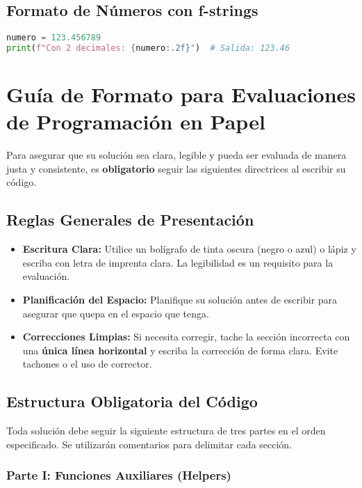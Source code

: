 \documentclass[11pt,a4paper]{article}
\begin{document}
\subsection{Formato de Números con f-strings}

\begin{lstlisting}[language=Python]
numero = 123.456789
print(f"Con 2 decimales: {numero:.2f}")  # Salida: 123.46
\end{lstlisting}

\newpage

\section{Guía de Formato para Evaluaciones de Programación en Papel}

Para asegurar que su solución sea clara, legible y pueda ser evaluada de manera justa y consistente, es \textbf{obligatorio} seguir las siguientes directrices al escribir su código.

\subsection{Reglas Generales de Presentación}

\begin{itemize}[leftmargin=*]
    \item \textbf{Escritura Clara:} Utilice un bolígrafo de tinta oscura (negro o azul) o lápiz y escriba con letra de imprenta clara. La legibilidad es un requisito para la evaluación.
    \item \textbf{Planificación del Espacio:} Planifique su solución antes de escribir para asegurar que quepa en el espacio que tenga.
    \item \textbf{Correcciones Limpias:} Si necesita corregir, tache la sección incorrecta con una \textbf{única línea horizontal} y escriba la corrección de forma clara. Evite tachones o el uso de corrector.
\end{itemize}

\subsection{Estructura Obligatoria del Código}

Toda solución debe seguir la siguiente estructura de tres partes en el orden especificado. Se utilizarán comentarios para delimitar cada sección.

\subsubsection{Parte I: Funciones Auxiliares (Helpers)}
\end{document}
